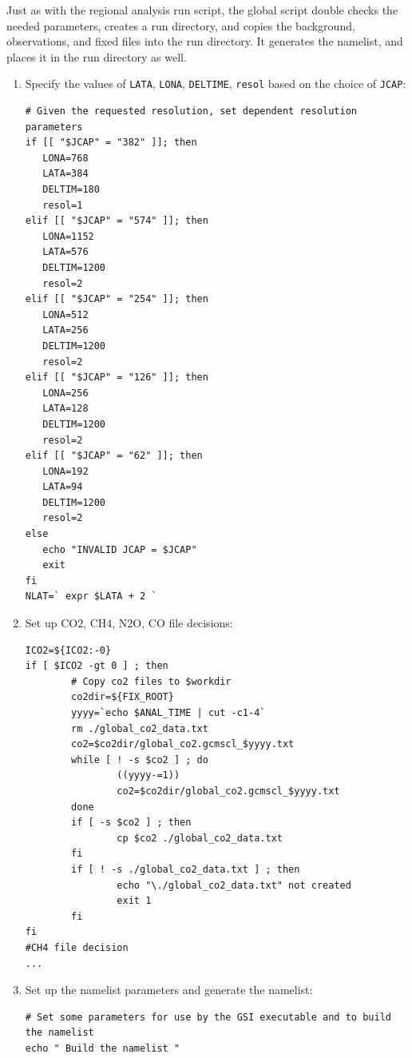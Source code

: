 Just as with the regional analysis run script, the global script double checks the needed parameters, creates a run directory, and copies the background, observations, and fixed files into the run directory. It generates the namelist, and places it in the run directory as well. 
\begin{enumerate}
\item Specify the values of \verb|LATA|, \verb|LONA|, \verb|DELTIME|, \verb|resol| based on the choice of \verb|JCAP|:
\begin{scriptsize}
\begin{verbatim}
# Given the requested resolution, set dependent resolution parameters
if [[ "$JCAP" = "382" ]]; then
   LONA=768
   LATA=384
   DELTIM=180
   resol=1
elif [[ "$JCAP" = "574" ]]; then
   LONA=1152
   LATA=576
   DELTIM=1200
   resol=2
elif [[ "$JCAP" = "254" ]]; then
   LONA=512
   LATA=256
   DELTIM=1200
   resol=2
elif [[ "$JCAP" = "126" ]]; then
   LONA=256
   LATA=128
   DELTIM=1200
   resol=2
elif [[ "$JCAP" = "62" ]]; then
   LONA=192
   LATA=94
   DELTIM=1200
   resol=2
else
   echo "INVALID JCAP = $JCAP"
   exit
fi
NLAT=` expr $LATA + 2 `
\end{verbatim}
\end{scriptsize}
\item Set up CO2, CH4, N2O, CO file decisions:
\begin{scriptsize}
\begin{verbatim}
ICO2=${ICO2:-0}
if [ $ICO2 -gt 0 ] ; then
        # Copy co2 files to $workdir
        co2dir=${FIX_ROOT}
        yyyy=`echo $ANAL_TIME | cut -c1-4`
        rm ./global_co2_data.txt
        co2=$co2dir/global_co2.gcmscl_$yyyy.txt
        while [ ! -s $co2 ] ; do
                ((yyyy-=1))
                co2=$co2dir/global_co2.gcmscl_$yyyy.txt
        done
        if [ -s $co2 ] ; then
                cp $co2 ./global_co2_data.txt
        fi
        if [ ! -s ./global_co2_data.txt ] ; then
                echo "\./global_co2_data.txt" not created
                exit 1
        fi
fi
#CH4 file decision
...

\end{verbatim}
\end{scriptsize}
\item Set up the namelist parameters and generate the namelist:
\begin{scriptsize}
\begin{verbatim}
# Set some parameters for use by the GSI executable and to build the namelist
echo " Build the namelist "


\end{verbatim}
\end{scriptsize}
\end{enumerate}
